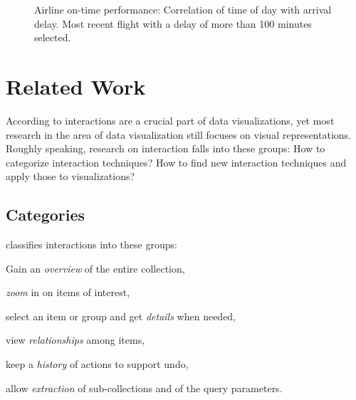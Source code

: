 \documentclass{article}
\begin{document}
\begin{figure}[h]
  \centering
  \caption{Airline on-time performance: Correlation of time of day with arrival delay. Most recent flight with a delay of more than 100 minutes selected.}\label{fig:research:cmv}
\end{figure}


\clearpage
\section{Related Work}\label{sec:related-work}
According to \textcite{Ho2013} interactions are a crucial part of data visualizations, yet most research in the area of data visualization still focuses on visual representations.
Roughly speaking, research on interaction falls into these groups:
How to categorize interaction techniques?
How to find new interaction techniques and apply those to visualizations?

\subsection{Categories}
\textcite{Shneiderman1996} classifies interactions into these groups:
\begin{enumerate*}[label=(\arabic*)]
  \item
    Gain an \emph{overview} of the entire collection,
  \item
    \emph{zoom} in on items of interest,
  \item
    select an item or group and get \emph{details} when needed,
  \item
    view \emph{relationships} among items,
  \item
    keep a \emph{history} of actions to support undo,
  \item
    allow \emph{extraction} of sub-collections and of the query parameters.
\end{enumerate*}
\end{document}
